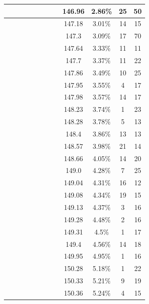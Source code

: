 \begin{center}
\begin{longtable}{|c|c|c|c|c|c|c|c|c|c|c|c|}
 \x &  \x &  &  &  &  &  &  & 146.96 & 2.86\% & 25 & 50 \\ \hline
 \x &  \x &  \x &  &  &  \x &  &  & 147.18 & 3.01\% & 14 & 15 \\ \hline
 \x &  &  \x &  \x &  &  \x &  &  \x & 147.3 & 3.09\% & 17 & 70 \\ \hline
 \x &  &  &  &  &  \x &  \x &  \x & 147.64 & 3.33\% & 11 & 11 \\ \hline
 \x &  &  \x &  &  &  &  &  \x & 147.7 & 3.37\% & 11 & 22 \\ \hline
 \x &  \x &  \x &  &  &  &  &  \x & 147.86 & 3.49\% & 10 & 25 \\ \hline
 \x &  &  &  &  \x &  \x &  \x &  \x & 147.95 & 3.55\% & 4 & 17 \\ \hline
 \x &  &  \x &  &  &  \x &  &  & 147.98 & 3.57\% & 14 & 17 \\ \hline
 \x &  &  &  &  \x &  \x &  \x &  & 148.23 & 3.74\% & 1 & 23 \\ \hline
 \x &  \x &  &  \x &  &  \x &  \x &  \x & 148.28 & 3.78\% & 5 & 13 \\ \hline
 \x &  &  &  \x &  \x &  \x &  \x &  & 148.4 & 3.86\% & 13 & 13 \\ \hline
 \x &  \x &  &  \x &  &  \x &  &  & 148.57 & 3.98\% & 21 & 14 \\ \hline
 \x &  \x &  \x &  \x &  &  &  &  \x & 148.66 & 4.05\% & 14 & 20 \\ \hline
 \x &  \x &  \x &  \x &  &  &  &  & 149.0 & 4.28\% & 7 & 25 \\ \hline
 \x &  \x &  &  &  \x &  &  &  \x & 149.04 & 4.31\% & 16 & 12 \\ \hline
 \x &  &  &  \x &  &  \x &  &  & 149.08 & 4.34\% & 19 & 15 \\ \hline
 \x &  &  \x &  &  &  \x &  \x &  & 149.13 & 4.37\% & 3 & 16 \\ \hline
 \x &  \x &  \x &  &  &  \x &  \x &  \x & 149.28 & 4.48\% & 2 & 16 \\ \hline
 \x &  \x &  &  \x &  \x &  \x &  &  & 149.31 & 4.5\% & 1 & 17 \\ \hline
 \x &  &  \x &  &  \x &  &  &  \x & 149.4 & 4.56\% & 14 & 18 \\ \hline
 \x &  \x &  \x &  &  &  \x &  &  \x & 149.95 & 4.95\% & 1 & 16 \\ \hline
 \x &  &  \x &  &  \x &  \x &  \x &  & 150.28 & 5.18\% & 1 & 22 \\ \hline
 \x &  \x &  \x &  \x &  &  \x &  &  \x & 150.33 & 5.21\% & 9 & 19 \\ \hline
 \x &  \x &  &  &  &  \x &  \x &  \x & 150.36 & 5.24\% & 4 & 15 \\ \hline

\end{longtable}
\end{center}
